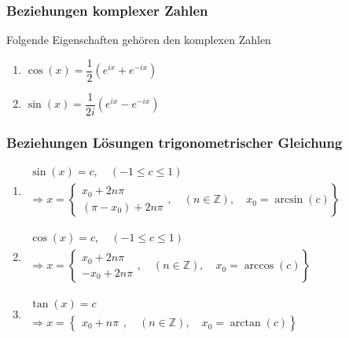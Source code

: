 \subsubsection{Beziehungen komplexer Zahlen}
Folgende Eigenschaften gehören den komplexen Zahlen
\begin{enumerate}[$(a)$]
\item $\cos\left(x\right)=\dfrac{1}{2}\left(e^{ix}+e^{-ix}\right)$
\item $\sin\left(x\right)=\dfrac{1}{2i}\left(e^{ix}-e^{-ix}\right)$
\end{enumerate} 
\subsubsection{Beziehungen Lösungen trigonometrischer Gleichung}
\begin{enumerate}[$(i)$]
\item $\begin{array}{l}\sin\left(x\right)=c,\quad \left(-1\leq c\leq 1\right)\\
\Longrightarrow x=\left\{\begin{array}{lll}x_0+2n\pi\\\left(\pi-x_0\right)+2n\pi\end{array},\quad \left(n\in\mathbb{Z}\right),\quad x_0=\arcsin\left(c\right)\right\}\end{array}$
\item $\begin{array}{l}\cos\left(x\right)=c,\quad \left(-1\leq c\leq 1\right)\\
\Longrightarrow x=\left\{\begin{array}{lll}x_0+2n\pi\\-x_0+2n\pi\end{array},\quad \left(n\in\mathbb{Z}\right),\quad x_0=\arccos\left(c\right)\right\}\end{array}$
\item $\begin{array}{l}\tan\left(x\right)=c\\
\Longrightarrow x=\left\{\begin{array}{lll}x_0+n\pi\end{array},\quad \left(n\in\mathbb{Z}\right),\quad x_0=\arctan\left(c\right)\right\}\end{array}$
\end{enumerate}
